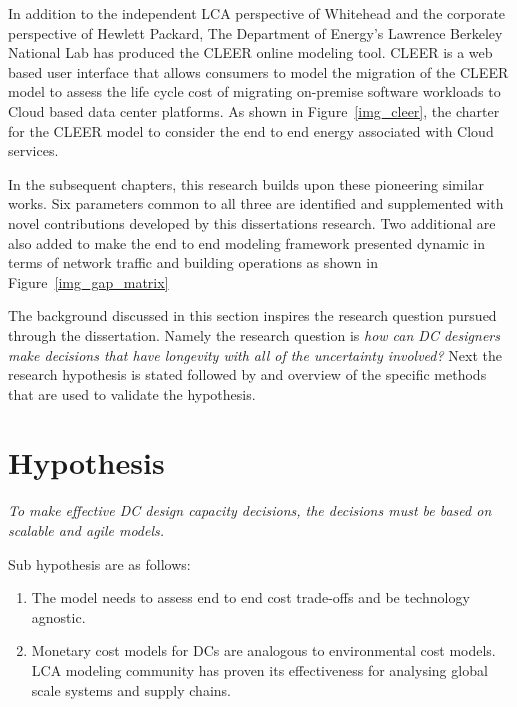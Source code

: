     In addition to the independent LCA perspective of Whitehead and the corporate perspective of Hewlett Packard, The Department of Energy's Lawrence Berkeley National Lab  has produced the CLEER online modeling tool\cite{CLEER13}. CLEER is a web based user interface that allows consumers to model the migration of the CLEER model to assess the life cycle cost of migrating on-premise software workloads to Cloud based data center platforms. As shown in Figure~\ref{img_cleer}, the charter for the CLEER model to consider the end to end energy associated with Cloud services.
    
    
    
    In the subsequent chapters, this research builds upon these pioneering similar works. Six parameters common to all three are identified and supplemented with novel contributions developed by this dissertations research. Two additional are also added to make the end to end modeling framework presented dynamic in terms of network traffic and building operations as shown in Figure~\ref{img_gap_matrix}
    
    
    
    The background discussed in this section inspires the research question pursued through the dissertation. Namely the research question is \emph{how can DC designers make decisions that have longevity with all of the uncertainty involved?} Next the research hypothesis is stated followed by and overview of the specific methods that are used to validate the hypothesis.
    
\section{Hypothesis}

    \emph{\large To make effective DC design capacity decisions, the decisions must be based on scalable and agile models.}
        
    Sub hypothesis are as follows:
    
    \begin{enumerate}
        \item The model needs to assess end to end cost trade-offs and be technology agnostic.
    
        \item Monetary cost models for DCs are analogous to environmental cost models. LCA modeling community has proven its effectiveness for analysing global scale systems and supply chains.
    \end{enumerate}
    
